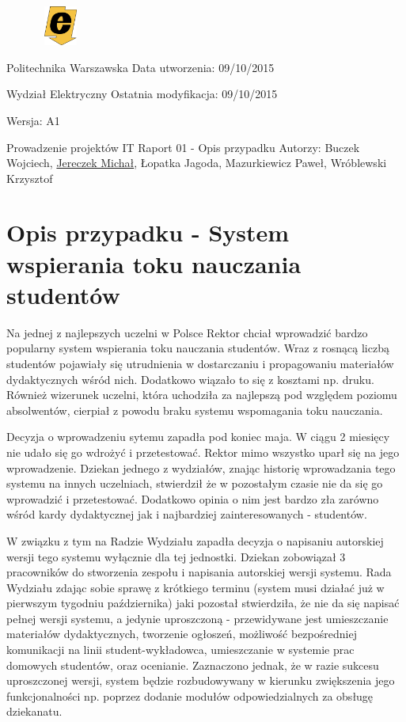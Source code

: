 \documentclass[a4paper, 12pt]{article}
\begin{document}
\begin{figure}
\includegraphics[width=1.5cm,height=1.3cm,keepaspectratio]{logo_ee.png}
\end{figure}

Politechnika Warszawska 
\hfill Data utworzenia: 09/10/2015

Wydział Elektryczny
\hfill Ostatnia modyfikacja: 09/10/2015

\hfill Wersja: A1

\quad
\begin{center}
\center \Huge Prowadzenie projektów IT
\center \large Raport 01 - Opis przypadku
\center \small Autorzy: Buczek Wojciech, \underline{Jereczek Michał}, Łopatka Jagoda, Mazurkiewicz Paweł, Wróblewski Krzysztof
\end{center}


\section{Opis przypadku - System wspierania toku nauczania studentów}

Na jednej z najlepszych uczelni w Polsce Rektor chciał wprowadzić bardzo popularny system wspierania toku nauczania studentów. Wraz z rosnącą liczbą studentów pojawiały się utrudnienia w dostarczaniu i propagowaniu materiałów dydaktycznych wśród nich. Dodatkowo wiązało to się z kosztami np. druku. Również wizerunek uczelni, która uchodziła za najlepszą pod względem poziomu absolwentów, cierpiał z powodu braku systemu wspomagania toku nauczania.

Decyzja o wprowadzeniu sytemu zapadła pod koniec maja. W ciągu 2 miesięcy nie udało się go wdrożyć i przetestować. Rektor mimo wszystko uparł się na jego wprowadzenie. Dziekan jednego z wydziałów, znając historię wprowadzania tego systemu na innych uczelniach, stwierdził że w pozostałym czasie nie da się go wprowadzić i przetestować. Dodatkowo opinia o nim jest bardzo zła zarówno wśród kardy dydaktycznej jak i najbardziej zainteresowanych - studentów.

W związku z tym na Radzie Wydziału zapadła decyzja o napisaniu autorskiej wersji tego systemu wyłącznie dla tej jednostki. Dziekan zobowiązał 3 pracowników do stworzenia zespołu i napisania autorskiej wersji systemu. Rada Wydziału zdając sobie sprawę z krótkiego terminu (system musi działać już w pierwszym tygodniu października) jaki pozostał stwierdziła, że nie da się napisać pełnej wersji systemu, a jedynie uproszczoną - przewidywane jest umieszczanie materiałów dydaktycznych, tworzenie ogłoszeń, możliwość bezpośredniej komunikacji na linii student-wykładowca, umieszczanie w systemie prac domowych studentów, oraz ocenianie. Zaznaczono jednak, że w razie sukcesu uproszczonej wersji, system będzie rozbudowywany w kierunku zwiększenia jego funkcjonalności np. poprzez dodanie modułów odpowiedzialnych za obsługę dziekanatu.
\end{document}
